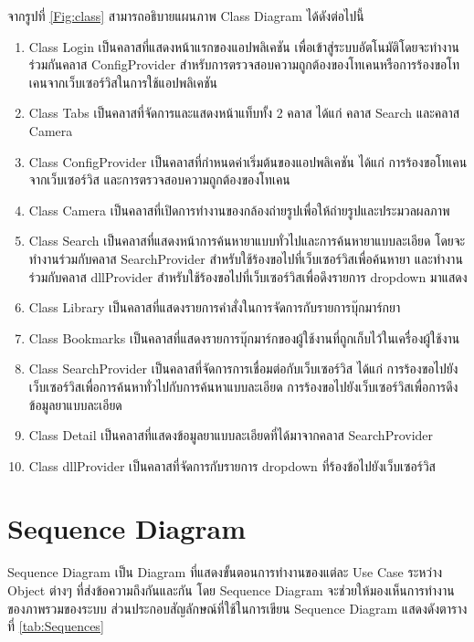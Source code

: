 	\newpage
	จากรูปที่ \ref{Fig:class} สามารถอธิบายแผนภาพ Class Diagram ได้ดังต่อไปนี้
	\begin{enumerate}
		\item Class Login เป็นคลาสที่แสดงหน้าแรกของแอปพลิเคชัน เพื่อเข้าสู่ระบบอัตโนมัติโดยจะทำงานร่วมกันคลาส ConfigProvider สำหรับการตรวจสอบความถูกต้องของโทเคนหรือการร้องขอโทเคนจากเว็บเซอร์วิสในการใช้แอปพลิเคชัน 
		\item Class Tabs เป็นคลาสที่จัดการและแสดงหน้าแท็บทั้ง 2 คลาส ได้แก่ คลาส Search และคลาส Camera 
		\item Class ConfigProvider เป็นคลาสที่กำหนดค่าเริ่มต้นของแอปพลิเคชัน ได้แก่ การร้องขอโทเคนจากเว็บเซอร์วิส และการตรวจสอบความถูกต้องของโทเคน 
		\item Class Camera เป็นคลาสที่เปิดการทำงานของกล้องถ่ายรูปเพื่อให้ถ่ายรูปและประมวลผลภาพ
		\item Class Search เป็นคลาสที่แสดงหน้าการค้นหายาแบบทั่วไปและการค้นหายาแบบละเอียด โดยจะทำงานร่วมกับคลาส SearchProvider สำหรับใช้ร้องขอไปที่เว็บเซอร์วิสเพื่อค้นหายา และทำงานร่วมกับคลาส dllProvider สำหรับใช้ร้องขอไปที่เว็บเซอร์วิสเพื่อดึงรายการ dropdown มาแสดง
		\item Class Library เป็นคลาสที่แสดงรายการคำสั่งในการจัดการกับรายการบุ๊กมาร์กยา 
		\item Class Bookmarks เป็นคลาสที่แสดงรายการบุ๊กมาร์กของผู้ใช้งานที่ถูกเก็บไว้ในเครื่องผู้ใช้งาน 
		\item Class SearchProvider เป็นคลาสที่จัดการการเชื่อมต่อกับเว็บเซอร์วิส ได้แก่ การร้องขอไปยังเว็บเซอร์วิสเพื่อการค้นหาทั่วไปกับการค้นหาแบบละเอียด การร้องขอไปยังเว็บเซอร์วิสเพื่อการดึงข้อมูลยาแบบละเอียด
		\item Class Detail เป็นคลาสที่แสดงข้อมูลยาแบบละเอียดที่ได้มาจากคลาส SearchProvider 
		\item Class dllProvider เป็นคลาสที่จัดการกับรายการ dropdown ที่ร้องข้อไปยังเว็บเซอร์วิส 
	\end{enumerate}

\newpage
\section{Sequence Diagram}
	Sequence Diagram เป็น Diagram ที่แสดงขั้นตอนการทำงานของแต่ละ Use Case ระหว่าง Object ต่างๆ ที่ส่งข้อความถึงกันและกัน โดย Sequence Diagram จะช่วยให้มองเห็นการทำงานของภาพรวมของระบบ ส่วนประกอบสัญลักษณ์ที่ใช้ในการเขียน Sequence Diagram 
	แสดงดังตารางที่ \ref{tab:Sequences}
	
